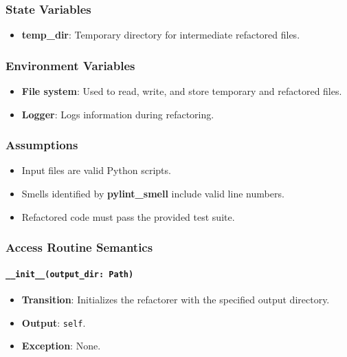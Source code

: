 \documentclass[12pt, titlepage]{article}
\begin{document}
\subsubsection{State Variables}

\begin{itemize}
  \item \textbf{temp\_dir}: Temporary directory for intermediate refactored files.
\end{itemize}

\subsubsection{Environment Variables}

\begin{itemize}
  \item \textbf{File system}: Used to read, write, and store temporary and refactored files.

  \item \textbf{Logger}: Logs information during refactoring.
\end{itemize}

\subsubsection{Assumptions}

\begin{itemize}
  \item Input files are valid Python scripts.
  \item Smells identified by \textbf{pylint\_smell} include valid line numbers.
  \item Refactored code must pass the provided test suite.
\end{itemize}

\subsubsection{Access Routine Semantics}

\paragraph{\texttt{\_\_init\_\_(output\_dir: Path)}}
\begin{itemize}
\item \textbf{Transition}: Initializes the refactorer with the specified output directory.
\item \textbf{Output}: \texttt{self}.
\item \textbf{Exception}: None.
\end{itemize}
\end{document}

